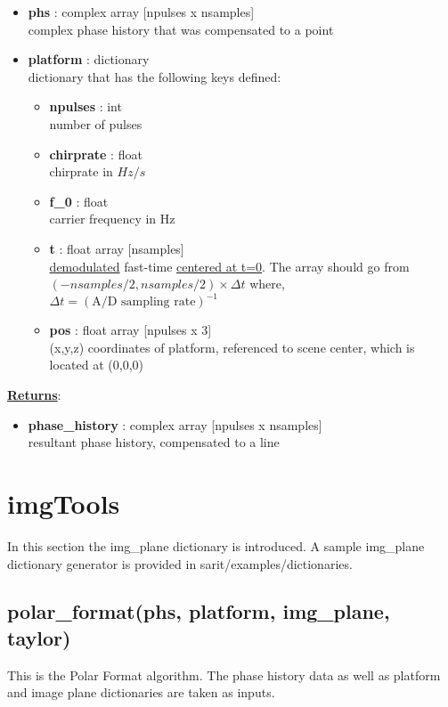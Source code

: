 \documentclass{article}
\newcommand{\defs}[2]{\textbf{{#1}} : {#2}}
\begin{document}
\begin{itemize}
	\item \defs{phs}{complex array [npulses x nsamples]}\\
  	complex phase history that was compensated to a point
  	\item \defs{platform}{dictionary}\\
  	dictionary that has the following keys defined:
	\begin{itemize}
	    \item \defs{npulses}{int}\\
	    	number of pulses
	    \item \defs{chirprate}{float}\\
	    	chirprate in $Hz/s$
	    \item \defs{f\_0}{float}\\
	    	carrier frequency in Hz
	    \item \defs{t}{float array [nsamples]}\\
	    	\underline{demodulated} fast-time \underline{centered at t=0}.  The array should go from $(-nsamples/2, nsamples/2)\times\Delta t$ where, $\Delta t = (\mbox{A/D sampling rate})^{-1}$
	    \item \defs{pos}{float array [npulses x 3]}\\
	       	(x,y,z) coordinates of platform, referenced to scene center, which is located at (0,0,0)
	\end{itemize}
\end{itemize}

\noindent \underline{\textbf{Returns}}:
\begin{itemize}
	\item \defs{phase\_history}{complex array [npulses x nsamples]}\\
	resultant phase history, compensated to a line
\end{itemize}

\newpage

\section{imgTools}
In this section the img\_plane dictionary is introduced.  A sample img\_plane dictionary generator is provided in sarit/examples/dictionaries.

\subsection{polar\_format(phs, platform, img\_plane, taylor)}
\label{sec:polar_format}
This is the Polar Format algorithm.  The phase history data as well as platform and image plane dictionaries are taken as inputs. 
\end{document}

